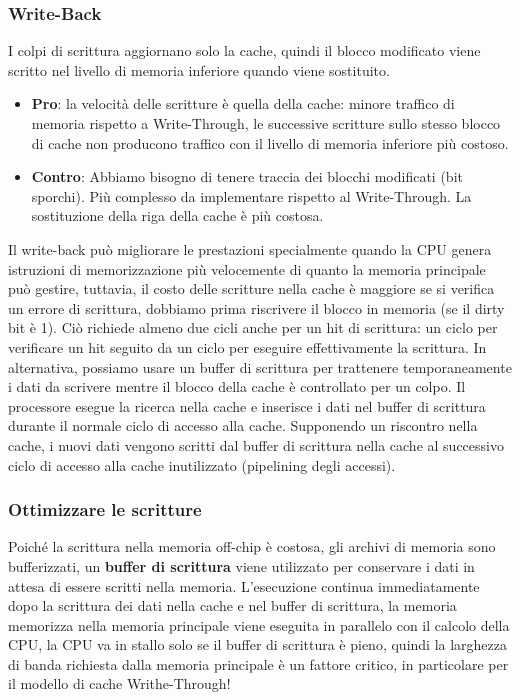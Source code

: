 \subsubsection{Write-Back}
I colpi di scrittura aggiornano solo la cache, quindi il blocco modificato viene scritto nel livello di memoria inferiore quando viene sostituito. 
\begin{itemize}
    \item \textbf{Pro}: la velocità delle scritture è quella della cache: minore traffico di memoria rispetto a Write-Through, le successive scritture sullo stesso blocco di cache non producono traffico con il livello di memoria inferiore più costoso.
    \item \textbf{Contro}: 
    Abbiamo bisogno di tenere traccia dei blocchi modificati (bit sporchi). Più complesso da implementare rispetto al Write-Through. La sostituzione della riga della cache è più costosa.
\end{itemize}
Il write-back può migliorare le prestazioni specialmente quando la CPU genera istruzioni di memorizzazione più velocemente di quanto la memoria principale può gestire, tuttavia, il costo delle scritture nella cache è maggiore se si verifica un errore di scrittura, dobbiamo prima riscrivere il blocco in memoria (se il dirty bit è 1). 
Ciò richiede almeno due cicli anche per un hit di scrittura: un ciclo per verificare un hit seguito da un ciclo per eseguire effettivamente la scrittura. In alternativa, possiamo usare un buffer di scrittura per trattenere temporaneamente i dati da scrivere mentre il blocco della cache è controllato per un colpo. 
Il processore esegue la ricerca nella cache e inserisce i dati nel buffer di scrittura durante il normale ciclo di accesso alla cache. Supponendo un riscontro nella cache, i nuovi dati vengono scritti dal buffer di scrittura nella cache al successivo ciclo di accesso alla cache inutilizzato (pipelining degli accessi).

\subsubsection{Ottimizzare le scritture}
Poiché la scrittura nella memoria off-chip è costosa, gli archivi di memoria sono bufferizzati, un \textbf{buffer di scrittura} viene utilizzato per conservare i dati in attesa di essere scritti nella memoria.
L'esecuzione continua immediatamente dopo la scrittura dei dati nella cache e nel buffer di scrittura, la memoria memorizza nella memoria principale viene eseguita in parallelo con il calcolo della CPU, 
la CPU va in stallo solo se il buffer di scrittura è pieno, quindi la larghezza di banda richiesta dalla memoria principale è un fattore critico, in particolare per il modello di cache Writhe-Through!

